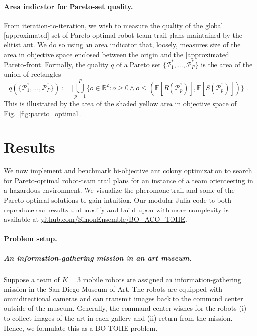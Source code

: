 \documentclass[11pt, oneside]{article}
\begin{document}
\paragraph{Area indicator for Pareto-set quality.}
From iteration-to-iteration, we wish to measure the quality of the global [approximated] set of Pareto-optimal robot-team trail plans maintained by the elitist ant. We do so using an area indicator \cite{cao2015using,guerreiro2020hypervolume} that, loosely, measures size of the area in objective space enclosed between the origin and the [approximated] Pareto-front. Formally, the quality $q$ of a Pareto set $\{\mathcal{P}^*_1, ...,\mathcal{P}^*_P\}$ is the area of the union of rectangles
\begin{equation}
	q(\{\mathcal{P}^*_1, ...,\mathcal{P}^*_{P}\}):=
	\Big \lvert 
		\bigcup_{p=1}^P \{ o \in \mathbb{R}^2 : o \geq 0 \wedge  o \leq (\mathbb{E}[R(\mathcal{P}^*_p)], \mathbb{E}[S(\mathcal{P}^*_p)]) \} 
	\Big \rvert. \label{eq:q}
\end{equation}
This is illustrated by the area of the shaded yellow area in objective space of Fig.~\ref{fig:pareto_optimal}.

\section{Results}
We now implement and benchmark bi-objective ant colony optimization to search for Pareto-optimal robot-team trail plans for an instance of a team orienteering in a hazardous environment. 
We visualize the pheromone trail and some of the Pareto-optimal solutions to gain intuition. 
Our modular Julia code to both reproduce our results and modify and build upon with more complexity is available at \url{github.com/SimonEnsemble/BO_ACO_TOHE}.

\paragraph{Problem setup.}
\subparagraph{An information-gathering mission in an art museum.} 
Suppose a team of $K=3$ mobile robots are assigned an information-gathering mission in the San Diego Museum of Art. The robots are equipped with omnidirectional cameras and can transmit images back to the command center outside of the museum. 
Generally, the command center wishes for the robots (i) to collect images of the art in each gallery and (ii) return from the mission. 
Hence, we formulate this as a BO-TOHE problem.
\end{document}
